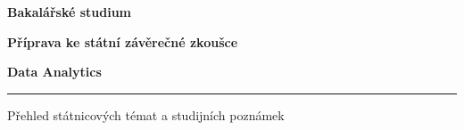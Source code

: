 \documentclass[12pt,a4paper]{article}
\begin{document}
\begin{titlepage}
  \centering
  \vspace*{2.4cm}
  {\Large\bfseries Bakalářské studium\par}
  \vspace{1.2cm}
  {\Huge\bfseries Příprava ke státní závěrečné zkoušce\par}
  \vspace{0.6cm}
  {\LARGE\bfseries Data Analytics\par}
  \vspace{0.8cm}
  \rule{0.72\textwidth}{0.4pt}\par
  \vspace{0.8cm}
  {\large Přehled státnicových témat a studijních poznámek\par}
  \vfill
\end{titlepage}

\tableofcontents
\newpage























\end{document}
